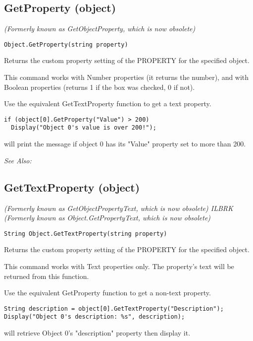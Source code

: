 \subsection{GetProperty (object)}\label{Object.GetProperty}%

\it{(Formerly known as GetObjectProperty, which is now obsolete)}

\begin{verbatim}
Object.GetProperty(string property)
\end{verbatim}
Returns the custom property setting of the PROPERTY for the specified object.

This command works with Number properties (it returns the number), and with Boolean
properties (returns 1 if the box was checked, 0 if not).

Use the equivalent GetTextProperty function to get a text property.

\begin{verbatim}
if (object[0].GetProperty("Value") > 200)
  Display("Object 0's value is over 200!");
\end{verbatim}
will print the message if object 0 has its "Value" property set to more than 200.

\it{See Also:} 


\subsection{GetTextProperty (object)}\label{Object.GetTextProperty}%

\it{(Formerly known as GetObjectPropertyText, which is now obsolete)} ILBRK
\it{(Formerly known as Object.GetPropertyText, which is now obsolete)}

\begin{verbatim}
String Object.GetTextProperty(string property)
\end{verbatim}
Returns the custom property setting of the PROPERTY for the specified object.

This command works with Text properties only. The property's text will be
returned from this function.

Use the equivalent GetProperty function to get a non-text property.

\begin{verbatim}
String description = object[0].GetTextProperty("Description");
Display("Object 0's description: %s", description);
\end{verbatim}
will retrieve Object 0's "description" property then display it.

